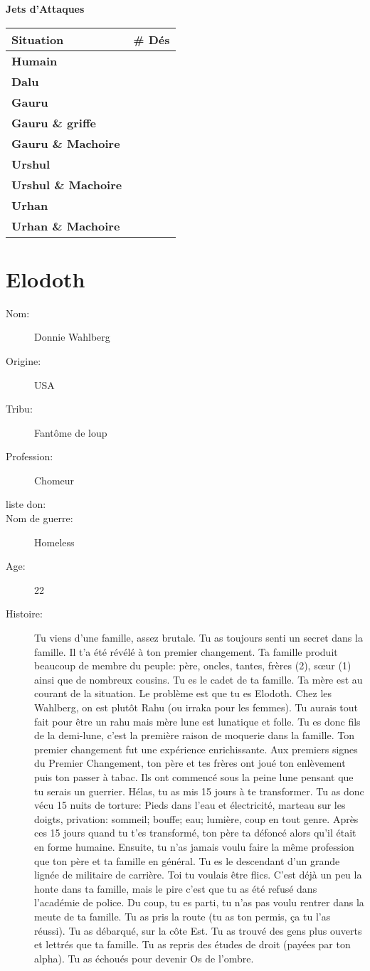 \documentclass[oneside,12pt]{book}
\newcounter{Somme}
\newcommand\attackRoll[1]{
\setcounter{Somme}{#1}
\textbf{Jets d'Attaques} \\
\begin{tabularx}{7cm}{|X|c|}
\hline
\textbf{Situation} & \textbf{\# Dés} \\
\hline
\textbf{Humain} & \theSomme \\
\hline
\addtocounter{Somme}{1}
\textbf{Dalu} & \theSomme \\
\hline
\addtocounter{Somme}{2}
\textbf{Gauru}& \theSomme \\
\hline
\addtocounter{Somme}{1}
\textbf{Gauru \& griffe}& \theSomme \\
\hline
\addtocounter{Somme}{1}
\textbf{Gauru \& Machoire}& \theSomme \\
\hline
\setcounter{Somme}{#1}
\addtocounter{Somme}{2}
\textbf{Urshul}& \theSomme \\
\hline
\addtocounter{Somme}{2}
\textbf{Urshul \& Machoire}& \theSomme \\
\hline
\setcounter{Somme}{#1}
\textbf{Urhan}& \theSomme \\
\hline
\addtocounter{Somme}{2}
\textbf{Urhan \& Machoire}& \theSomme \\
\hline
\end{tabularx}

}
\begin{document}
\begin{flushleft}
\attackRoll{4}




\clearpage
\section{Elodoth}
\begin{description}
\item[Nom:]{Donnie Wahlberg}
\item[Origine:]{USA}
\item[Tribu:]{Fantôme de loup}
\item[Profession:]{Chomeur}
\item[liste don:]{}
\item[Nom de guerre:]{Homeless}
\item[Age:]{22}
\item[Histoire:]{ 
	Tu viens d'une famille, assez brutale. Tu as toujours senti un secret dans la famille. Il t'a été révélé à ton premier changement. 
	Ta famille produit beaucoup de membre du peuple: père, oncles, tantes, frères (2), sœur (1) ainsi que de nombreux cousins. Tu es le cadet de ta famille. Ta mère est au courant de la situation. Le problème est que tu es Elodoth. Chez les Wahlberg, on est plutôt Rahu (ou irraka pour les femmes). Tu aurais tout fait pour être un rahu mais mère lune est lunatique et folle. 
	Tu es donc fils de la demi-lune, c'est la première raison de moquerie dans la famille. 
Ton premier changement fut une expérience enrichissante. Aux premiers signes du Premier Changement, ton père et tes frères ont joué ton enlèvement puis ton passer à tabac. 
Ils ont commencé sous la peine lune pensant que tu serais un guerrier. Hélas, tu as mis 15 jours à te transformer. 
Tu as donc vécu 15 nuits de torture: Pieds dans l'eau et électricité, marteau sur les doigts, privation: sommeil; bouffe; eau; lumière, coup en tout genre. 
Après ces 15 jours quand tu t'es transformé, ton père ta défoncé alors qu'il était en forme humaine.  
Ensuite, tu n'as jamais voulu faire la même profession que ton père et ta famille en général. 
Tu es le descendant d'un grande lignée de militaire de carrière. Toi tu voulais être flics. 
C'est déjà un peu la honte dans ta famille, mais le pire c'est que tu as été refusé dans l'académie de police. 
Du coup, tu es parti, tu n'as pas voulu rentrer dans la meute de ta famille.  Tu as pris la route (tu as ton permis, ça tu l'as réussi). 
Tu as débarqué, sur la côte Est. Tu as trouvé des gens plus ouverts et lettrés que ta famille. Tu as repris des études de droit (payées par ton alpha). Tu as échoués pour devenir Os de l'ombre. 
}
\end{description}
\end{flushleft}
\end{document}
